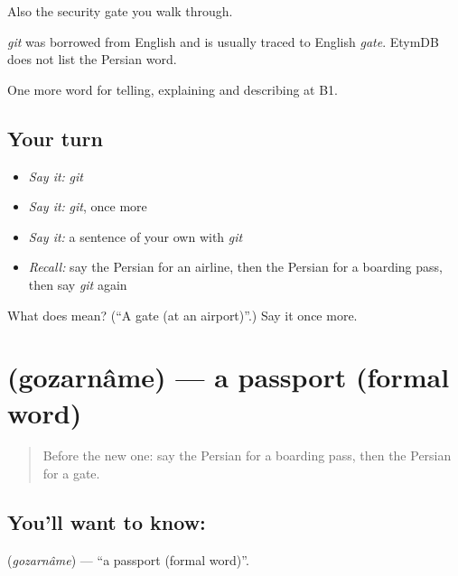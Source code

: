 Also the security gate you walk through.

\begin{cousinweb}
\emph{git} was borrowed from English and is usually traced to English \emph{gate}. EtymDB does not list the Persian word.
\end{cousinweb}

\begin{grammarlens}[title={What you've built}]
One more word for telling, explaining and describing at B1.
\end{grammarlens}

\subsection*{Your turn}
\begin{itemize}
\raggedright
  \item \emph{Say it:} \emph{git}
  \item \emph{Say it:} \emph{git}, once more
  \item \emph{Say it:} a sentence of your own with \emph{git}
  \item \emph{Recall:} say the Persian for an airline, then the Persian for a boarding pass, then say \emph{git} again
\end{itemize}

\begin{tcolorbox}[breakable,colback=teal!4,colframe=teal!35!black,title={Before you move on}]
What does  mean? (\textquotedblleft{}A gate (at an airport)\textquotedblright{}.) Say it once more.
\end{tcolorbox}
\section[\texorpdfstring{\fa{گذرنامه} (gozarnâme)}{گذرنامه (gozarnâme)}]{ (gozarnâme) — a passport (formal word)}

\label{lesson:FA-C432-gozarname}



\begin{quote}
Before the new one: say the Persian for a boarding pass, then the Persian for a gate.
\end{quote}

\subsection*{You'll want to know: }
\textbf{} (\emph{gozarnâme}) — \textquotedblleft{}a passport (formal word)\textquotedblright{}.

